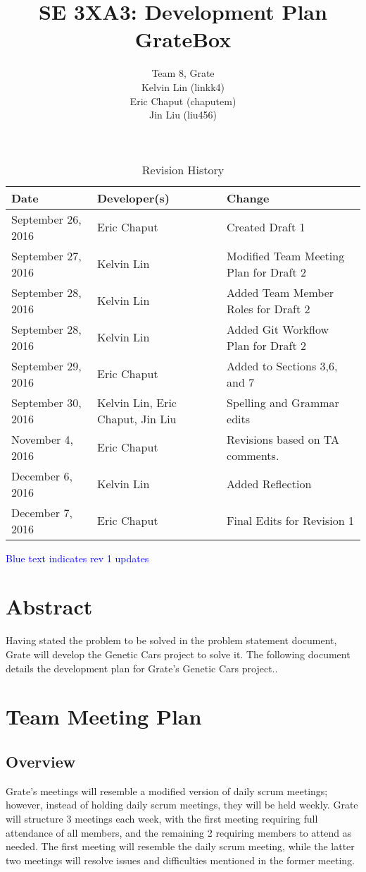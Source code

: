\documentclass{article}
\title{SE 3XA3: Development Plan\\GrateBox}
\author{Team 8, Grate
		\\ Kelvin Lin (linkk4)
		\\ Eric Chaput (chaputem)
		\\ Jin Liu (liu456)
}
\date{}
\begin{document}
\begin{table}[hp]
\caption{Revision History} \label{TblRevisionHistory}
\begin{tabularx}{\textwidth}{llX}
\toprule
\textbf{Date} & \textbf{Developer(s)} & \textbf{Change}\\
\midrule
September 26, 2016 & Eric Chaput & Created Draft 1\\
September 27, 2016 & Kelvin Lin & Modified Team Meeting Plan for Draft 2\\
September 28, 2016 & Kelvin Lin & Added Team Member Roles for Draft 2\\
September 28, 2016 & Kelvin Lin & Added Git Workflow Plan for Draft 2\\
September 29, 2016 & Eric Chaput & Added to Sections 3,6, and 7\\
September 30, 2016 & Kelvin Lin, Eric Chaput, Jin Liu & Spelling and Grammar 
edits\\
November 4, 2016 & Eric Chaput & Revisions based on TA comments.\\
December 6, 2016 & Kelvin Lin & Added Reflection\\
December 7, 2016 & Eric Chaput & Final Edits for Revision 1\\
\bottomrule
\end{tabularx}
\end{table}

\newpage

\maketitle

\textcolor{blue}{Blue text indicates rev 1 updates}

\section{Abstract}

Having stated the problem to be solved in the problem statement document, Grate 
will develop the Genetic Cars project to solve it. The following document 
details the development plan for Grate's Genetic Cars project..

\section{Team Meeting Plan}

\subsection{Overview}
Grate's meetings will resemble a modified version of daily scrum meetings; 
however, instead of holding daily scrum meetings, they will be held weekly. 
Grate will structure 3 meetings each week, with the first meeting requiring full 
attendance of all members, and the remaining 2 requiring members to attend as 
needed. The first meeting will resemble the daily scrum meeting, while the 
latter two meetings will resolve issues and difficulties mentioned in the former 
meeting.
\end{document}
